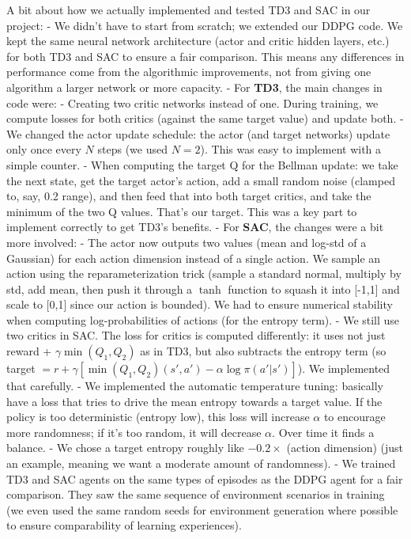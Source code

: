 \documentclass[11pt]{article}
\begin{document}
		A bit about how we actually implemented and tested TD3 and SAC in our project:
		- We didn’t have to start from scratch; we extended our DDPG code. We kept the same neural network architecture (actor and critic hidden layers, etc.) for both TD3 and SAC to ensure a fair comparison. This means any differences in performance come from the algorithmic improvements, not from giving one algorithm a larger network or more capacity.
		- For \textbf{TD3}, the main changes in code were:
		- Creating two critic networks instead of one. During training, we compute losses for both critics (against the same target value) and update both.
		- We changed the actor update schedule: the actor (and target networks) update only once every $N$ steps (we used $N=2$). This was easy to implement with a simple counter.
		- When computing the target Q for the Bellman update: we take the next state, get the target actor’s action, add a small random noise (clamped to, say, 0.2 range), and then feed that into both target critics, and take the minimum of the two Q values. That’s our target. This was a key part to implement correctly to get TD3’s benefits.
		- For \textbf{SAC}, the changes were a bit more involved:
		- The actor now outputs two values (mean and log-std of a Gaussian) for each action dimension instead of a single action. We sample an action using the reparameterization trick (sample a standard normal, multiply by std, add mean, then push it through a $\tanh$ function to squash it into [-1,1] and scale to [0,1] since our action is bounded). We had to ensure numerical stability when computing log-probabilities of actions (for the entropy term).
		- We still use two critics in SAC. The loss for critics is computed differently: it uses not just reward + $\gamma \min(Q_1, Q_2)$ as in TD3, but also subtracts the entropy term (so target $= r + \gamma [\min(Q_1, Q_2)(s',a') - \alpha \log \pi(a'|s')]$). We implemented that carefully.
		- We implemented the automatic temperature tuning: basically have a loss that tries to drive the mean entropy towards a target value. If the policy is too deterministic (entropy low), this loss will increase $\alpha$ to encourage more randomness; if it’s too random, it will decrease $\alpha$. Over time it finds a balance.
		- We chose a target entropy roughly like $-0.2 \times$ (action dimension) (just an example, meaning we want a moderate amount of randomness).
		- We trained TD3 and SAC agents on the same types of episodes as the DDPG agent for a fair comparison. They saw the same sequence of environment scenarios in training (we even used the same random seeds for environment generation where possible to ensure comparability of learning experiences).
\end{document}
